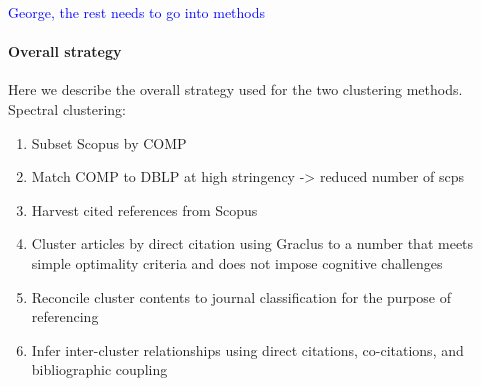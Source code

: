 \textcolor{blue}{George, the rest needs to go into methods}


\paragraph{Overall strategy}

Here we describe the overall strategy used for the two clustering methods.\\


\noindent
 Spectral clustering:
\begin{enumerate}
\item Subset Scopus by COMP
\item Match COMP to DBLP at high stringency -> reduced number of scps
 \item Harvest cited references  from Scopus
 \item Cluster articles by direct citation using Graclus to a number that meets simple optimality criteria and does not impose cognitive challenges
 \item Reconcile cluster contents to journal classification for the purpose of referencing
 \item Infer inter-cluster relationships using direct citations, co-citations, and bibliographic coupling
\end{enumerate}

